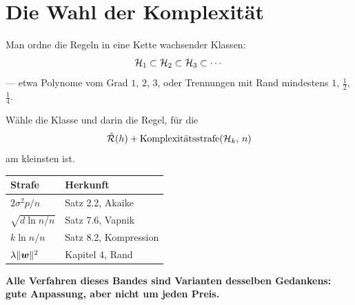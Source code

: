 \begin{merksatz}
\begin{center}
\begin{minipage}{0.88\textwidth}
\end{minipage}
\end{center}
\end{merksatz}

\section{Die Wahl der Komplexität}

\begin{merksatz}
Man ordne die Regeln in eine Kette wachsender Klassen:
\[ \mathcal{H}_1 \subset \mathcal{H}_2 \subset \mathcal{H}_3 \subset \cdots \]
--- etwa Polynome vom Grad $1$, $2$, $3$, oder Trennungen mit Rand mindestens $1$, $\tfrac12$, $\tfrac14$.

Wähle die Klasse und darin die Regel, für die
\[ \hat{\mathcal{R}}(h) + \text{Komplexitätsstrafe}(\mathcal{H}_k,\,n) \]
am kleinsten ist.

\begin{center}
{\small
\renewcommand{\arraystretch}{1.5}
\begin{tabular}{@{}P{2.6cm}P{6.0cm}@{}}
\toprule
\textbf{Strafe} & \textbf{Herkunft}\\
\midrule
$2\sigma^{2}p/n$ & Satz 2.2, Akaike\\
$\sqrt{d\ln n/n}$ & Satz 7.6, Vapnik\\
$k\ln n/n$ & Satz 8.2, Kompression\\
$\lambda\|\boldsymbol{w}\|^{2}$ & Kapitel 4, Rand\\
\bottomrule
\end{tabular}}
\end{center}

\begin{center}
\begin{minipage}{0.9\textwidth}
\textbf{Alle Verfahren dieses Bandes sind Varianten desselben Gedankens: gute Anpassung, aber nicht um jeden Preis.}
\end{minipage}
\end{center}

\begin{center}
\begin{minipage}{0.88\textwidth}
\end{minipage}
\end{center}
\end{merksatz}

